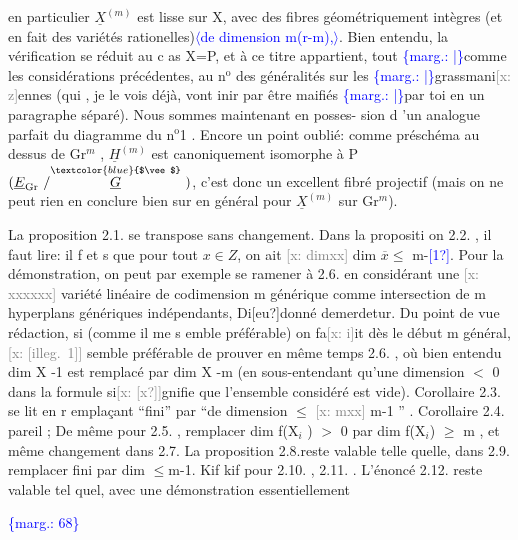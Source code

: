 \documentclass[11pt]{article}
\newcommand{\scanpage}[1]{\par\bigskip\noindent{\small\sffamily[scan #1]}\par}
\newcommand{\mspage}[1]{{\small\sffamily[p.\,#1]}}
\newcommand{\hand}[1]{\textcolor{blue}{#1}}
\let\over\relax
\newcommand{\over}[2]{\textcolor{gray}{#1}\textcolor{blue}{\ensuremath{^{\!\nearrow}}#2}}
\newcommand{\inserted}[2][]{\textcolor{blue}{$\langle$#2$\rangle$}}
\newcommand{\margin}[1]{\textcolor{blue}{\{\textsf{marg.:} #1\}}}
\newcommand{\xout}[1]{\textcolor{gray}{[\textsf{x:} #1]}}
\newcommand{\unsure}[1]{[#1?]}
\newcommand{\illegible}[1]{[\textsf{illeg.\ #1}]}
\begin{document}
en particulier $\underline{X}^{(m)}$ est lisse sur X, avec des fibres géométriquement
intègres (et en fait des variétés rationelles)\inserted[typed]{de dimension m(r-m),}. Bien entendu, la
vérification se réduit au c as X=P, et à ce titre appartient, tout
\margin{|}comme les considérations précédentes, au n$^{\text{o}}$ des généralités sur les
\margin{|}grassmani\xout{z}ennes (qui , je le vois déjà, vont \over{\unsure{f}}{f}inir par être ma\over{\unsure{gu}}{\unsure{g}}ifiés
\margin{|}par toi en un paragraphe séparé). Nous sommes maintenant en posses-%
sion d 'un analogue parfait du diagramme du n$^{\text{o}}$1 . Encore un point
oublié: comme préschéma au dessus de Gr$^{m}$ , $\underline{H}^{(m)}$ est canoniquement
isomorphe à P$(\underline{E}_{\mathrm{Gr}}\ /\overset{\hand{$\vee$}}{\underline{G}}\ )$, c'est donc un excellent fibré projectif
(mais on ne peut rien en conclure bien sur en général pour $\underline{X}^{(m)}$ sur
Gr$^{m}$).

La proposition 2.1. se transpose sans changement. Dans la
propositi on 2.2. , il faut lire: il f et s que pour tout $x \in Z$, on
ait \xout{dimxx} dim $\overline{x} \leqslant$ m-\hand{\unsure{1}}. Pour la démonstration, on peut par exemple
se ramener à 2.6. en considérant une \xout{xxxxxx} variété linéaire de
codimension m générique comme intersection de m hyperplans génériques
indépendants, Di\unsure{eu}donné demerdetur. Du point de vue rédaction, si
(comme il me s emble préférable) on fa\xout{i}it dès le début m général, \xout{\illegible{1}}
semble préférable de prouver en même temps 2.6. , où bien entendu
dim X -1 est remplacé par dim X -m (en sous-entendant qu'une dimension
$<$ 0 dans la formule si\xout{\unsure{x}}gnifie que l'ensemble considéré est vide).
Corollaire 2.3. se lit en r emplaçant ``fini'' par ``de dimension $\leqslant$ \xout{mxx}
m-1 '' . Corollaire 2.4. pareil ; De même pour 2.5. , remplacer
dim f(X$_{i}$ ) $>$ 0 par dim f(X$_{i}$) $\geqslant$ m , et même changement dans 2.7.
La proposition 2.8.reste valable telle quelle, dans 2.9. remplacer
fini par dim $\leqslant$m-1. Kif kif pour 2.10. , 2.11. . L'énoncé
2.12. reste valable tel quel, avec une démonstration essentiellement

\margin{68}

\clearpage
\scanpage{25/69}
\mspage{69}
\end{document}
